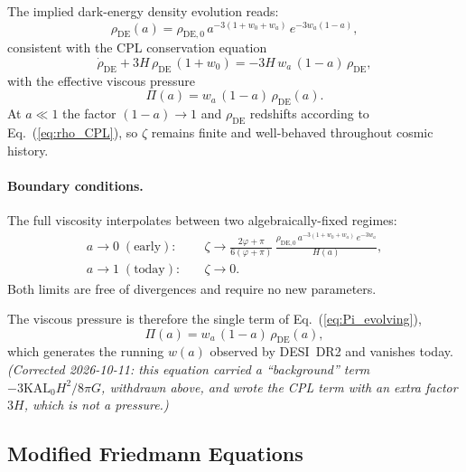 The implied dark-energy density evolution reads:
%
\begin{equation}
  \rho_{\mathrm{DE}}(a)
    = \rho_{\mathrm{DE},0}\,
      a^{-3(1+w_0+w_a)}\,e^{-3w_a(1-a)},
  \label{eq:rho_CPL}
\end{equation}
%
consistent with the CPL conservation equation
%
\begin{equation}
  \dot\rho_{\mathrm{DE}}
    + 3H\,\rho_{\mathrm{DE}}\,(1+w_0)
    = -3H\,w_a\,(1-a)\,\rho_{\mathrm{DE}},
  \label{eq:cont_CPL}
\end{equation}
%
with the effective viscous pressure
%
\begin{equation}
  \Pi(a)
    = w_a\,(1-a)\,\rho_{\mathrm{DE}}(a).
  \label{eq:Pi_evolving}
\end{equation}
%
At $a \ll 1$ the factor $(1-a)\to 1$ and $\rho_{\mathrm{DE}}$ redshifts
according to Eq.~(\ref{eq:rho_CPL}), so $\zeta$ remains finite and
well-behaved throughout cosmic history.

\paragraph{Boundary conditions.}
The full viscosity interpolates between two algebraically-fixed regimes:
%
\begin{align}
  a \to 0 \;(\text{early}): &\quad
    \zeta \to \frac{2\varphi+\pi}{6(\varphi+\pi)}\,
              \frac{\rho_{\mathrm{DE,0}}\,a^{-3(1+w_0+w_a)}\,e^{-3w_a}}{H(a)},
  \label{eq:zeta_early}\\[4pt]
  a \to 1 \;(\text{today}): &\quad
    \zeta \to 0.
  \label{eq:zeta_today}
\end{align}
%
Both limits are free of divergences and require no new parameters.

The viscous pressure is therefore the single term of Eq.~(\ref{eq:Pi_evolving}),
%
\begin{equation}
  \Pi(a) = w_a\,(1-a)\,\rho_{\mathrm{DE}}(a),
  \label{eq:Pi_total}
\end{equation}
%
which generates the running $w(a)$ observed by DESI~DR2 \citep{AbdulKarim2025}
and vanishes today. \emph{(Corrected 2026-10-11: this equation carried a
``background'' term $-3\mathrm{KAL}_0H^2/8\pi G$, withdrawn above, and wrote the
CPL term with an extra factor $3H$, which is not a pressure.)}

\subsection{Modified Friedmann Equations}
\label{sec:eft:friedmann}

